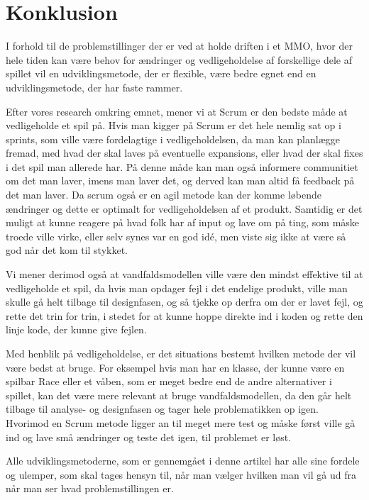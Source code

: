 \cfoot{\page\textbackslash \totalp} %
\chapter{Konklusion}
I forhold til de problemstillinger der er ved at holde driften i et MMO, hvor der hele tiden kan være behov for ændringer og vedligeholdelse af forskellige dele af spillet vil en udviklingsmetode, der er flexible, være bedre egnet end en udviklingsmetode, der har faste rammer.

Efter vores research omkring emnet, mener vi at Scrum er den bedste måde at vedligeholde et spil på. Hvis man kigger på Scrum er det hele nemlig sat op i sprints, som ville være fordelagtige i vedligeholdelsen, da man kan planlægge fremad, med hvad der skal laves på eventuelle expansions, eller hvad der skal fixes i det spil man allerede har. På denne måde kan man også informere communitiet om det man laver, imens man laver det, og derved kan man altid få feedback på det man laver. Da scrum også er en agil metode kan der komme løbende ændringer og dette er optimalt for vedligeholdelsen af et produkt. Samtidig er det muligt at kunne reagere på hvad folk har af input og lave om på ting, som måske troede ville virke, eller selv synes var en god idé, men viste sig ikke at være så god når det kom til stykket.

Vi mener derimod også at vandfaldsmodellen ville være den mindst effektive til at vedligeholde et spil, da hvis man opdager fejl i det endelige produkt, ville man skulle gå helt tilbage til designfasen, og så tjekke op derfra om der er lavet fejl, og rette det trin for trin, i stedet for at kunne hoppe direkte ind i koden og rette den linje kode, der kunne give fejlen.

Med henblik på vedligeholdelse, er det situations bestemt hvilken metode der vil være bedst at bruge. For eksempel hvis man har en klasse, der kunne være en spilbar Race eller et våben, som er meget bedre end de andre alternativer i spillet, kan det være mere relevant at bruge vandfaldsmodellen, da den går helt tilbage til analyse- og designfasen og tager hele problematikken op igen. Hvorimod en Scrum metode ligger an til meget mere test og måske først ville gå ind og lave små ændringer og teste det igen, til problemet er løst.

Alle udviklingsmetoderne, som er gennemgået i denne artikel har alle sine fordele og ulemper, som skal tages hensyn til, når man vælger hvilken man vil gå ud fra når man ser hvad problemstillingen er. 
